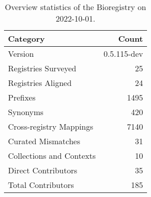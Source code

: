 \begin{table}
\centering
\caption{Overview statistics of the Bioregistry on 2022-10-01.}
\label{tab:bioregistry-summary}
\begin{tabular}{lr}
\toprule
                Category &       Count \\
\midrule
                 Version & 0.5.115-dev \\
     Registries Surveyed &          25 \\
      Registries Aligned &          24 \\
                Prefixes &        1495 \\
                Synonyms &         420 \\
 Cross-registry Mappings &        7140 \\
      Curated Mismatches &          31 \\
Collections and Contexts &          10 \\
     Direct Contributors &          35 \\
      Total Contributors &         185 \\
\bottomrule
\end{tabular}
\end{table}
